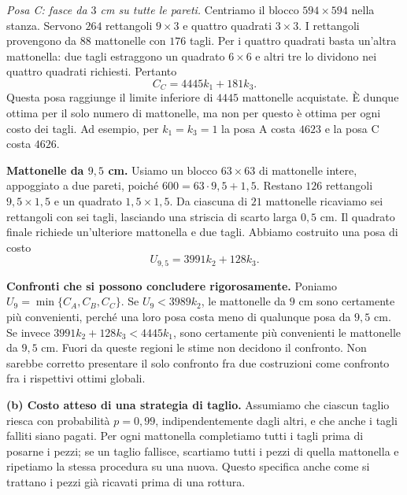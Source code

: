 {\emph{Posa C: fasce da $3$ cm su tutte le pareti.}
Centriamo il blocco $594\times594$ nella stanza. Servono $264$
rettangoli $9\times3$ e quattro quadrati $3\times3$.
I rettangoli provengono da $88$ mattonelle con $176$ tagli.
Per i quattro quadrati basta un'altra mattonella: due tagli estraggono
un quadrato $6\times6$ e altri tre lo dividono nei quattro quadrati
richiesti. Pertanto
\[
 C_C=4445k_1+181k_3.
\]
Questa posa raggiunge il limite inferiore di $4445$ mattonelle acquistate.
\`E dunque ottima per il solo numero di mattonelle, ma non per questo
\`e ottima per ogni costo dei tagli.
Ad esempio, per $k_1=k_3=1$ la posa A costa $4623$ e la posa C costa $4626$.

\textbf{Mattonelle da $9{,}5$ cm.}
Usiamo un blocco $63\times63$ di mattonelle intere, appoggiato a due
pareti, poich\'e $600=63\cdot9{,}5+1{,}5$.
Restano $126$ rettangoli $9{,}5\times1{,}5$ e un quadrato
$1{,}5\times1{,}5$.
Da ciascuna di $21$ mattonelle ricaviamo sei rettangoli con sei tagli,
lasciando una striscia di scarto larga $0{,}5$ cm.
Il quadrato finale richiede un'ulteriore mattonella e due tagli.
Abbiamo costruito una posa di costo
\[
 U_{9{,}5}=3991k_2+128k_3.
\]

\textbf{Confronti che si possono concludere rigorosamente.}
Poniamo $U_9=\min\{C_A,C_B,C_C\}$.
Se $U_9<3989k_2$, le mattonelle da $9$ cm sono certamente pi\`u
convenienti, perch\'e una loro posa costa meno di qualunque posa da
$9{,}5$ cm. Se invece $3991k_2+128k_3<4445k_1$, sono certamente
pi\`u convenienti le mattonelle da $9{,}5$ cm.
Fuori da queste regioni le stime non decidono il confronto.
Non sarebbe corretto presentare il solo confronto fra due costruzioni
come confronto fra i rispettivi ottimi globali.

\textbf{(b) Costo atteso di una strategia di taglio.}
Assumiamo che ciascun taglio riesca con probabilit\`a $p=0{,}99$,
indipendentemente dagli altri, e che anche i tagli falliti siano pagati.
Per ogni mattonella completiamo tutti i tagli prima di posarne i pezzi;
se un taglio fallisce, scartiamo tutti i pezzi di quella mattonella e
ripetiamo la stessa procedura su una nuova. Questo specifica anche
come si trattano i pezzi gi\`a ricavati prima di una rottura.

}
